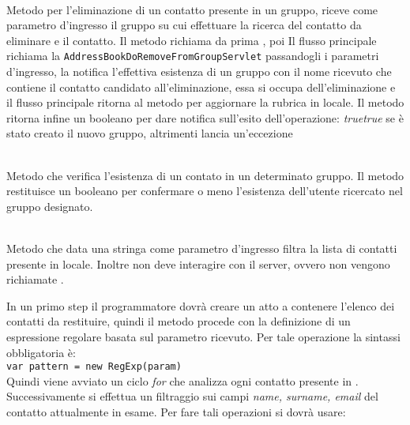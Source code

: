 \begin{description}
	\item{}\\
	Metodo per l'eliminazione di un contatto presente in un gruppo, riceve come parametro d'ingresso il gruppo su cui effettuare la ricerca del contatto da eliminare e il contatto. 
Il metodo richiama da prima , poi Il flusso principale richiama la  \texttt{AddressBookDoRemoveFromGroupServlet} passandogli i parametri d'ingresso, la  notifica l'effettiva esistenza di un gruppo con il nome ricevuto che contiene il contatto candidato all'eliminazione, essa si occupa dell'eliminazione e il flusso principale ritorna al metodo  per aggiornare la rubrica in locale. Il metodo ritorna infine un  booleano per dare notifica sull'esito dell'operazione: \textit{true}\textit{true} se è stato creato il nuovo gruppo, altrimenti lancia un'eccezione
	
	\item{}\\
Metodo che verifica l'esistenza di un contato in un determinato gruppo. Il metodo restituisce un  booleano per confermare o meno l'esistenza dell'utente ricercato nel gruppo designato.

\item{}\\
Metodo che data una stringa come parametro d'ingresso filtra la lista di contatti presente in locale. Inoltre non deve interagire con il server, ovvero non vengono richiamate .

In un primo step il programmatore dovrà creare un  atto a contenere l'elenco dei contatti da restituire, quindi il metodo procede con la definizione di un espressione regolare basata sul parametro ricevuto. Per tale operazione la sintassi obbligatoria è:\\

\verb|var pattern = new RegExp(param)|\\

Quindi viene avviato un ciclo \textit{for} che analizza ogni contatto presente in . Successivamente si effettua un filtraggio sui campi \textit{name, surname, email} del contatto attualmente in esame. Per fare tali operazioni si dovrà usare:\\


\end{description}
